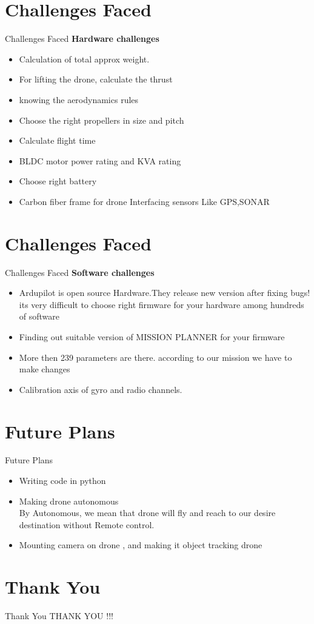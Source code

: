 \documentclass[10pt, a4paper]{beamer}
\begin{document}
\section{Challenges Faced}
\begin{frame}{Challenges Faced}
     \large\textbf{Hardware challenges}
	\begin{itemize}
	    \item Calculation of total approx weight.
	    \item For lifting the drone, calculate the thrust
	    \item knowing the aerodynamics rules
	    \item Choose the right propellers in size and pitch
	    \item Calculate flight time
	    \item BLDC motor power rating and KVA rating
	    \item Choose right battery 
	    \item Carbon fiber frame for drone
	    \inem Interfacing sensors Like GPS,SONAR
	    
	\end{itemize}
\end{frame}

\section{Challenges Faced}
\begin{frame}{Challenges Faced}
     \large\textbf{Software challenges}
	\begin{itemize}
	    \item Ardupilot is open source Hardware.They release new version after fixing bugs! its very difficult to choose right firmware  for your hardware among hundreds of software
	    \item Finding out suitable version of MISSION PLANNER for your firmware
	    \item More then 239 parameters are there. according to our mission we have to make changes
		\item Calibration axis of gyro and radio channels.
	\end{itemize}
\end{frame}


\section{Future Plans}
\begin{frame}{Future Plans}
	\begin{itemize}
	    
		\item Writing code in python 
		\item Making drone autonomous\\
		By Autonomous, we mean that drone will fly and reach to our desire destination without Remote control.
		\item Mounting camera on drone , and making it object tracking drone
	\end{itemize}
\end{frame}


\section{Thank You}
\begin{frame}{Thank You}
	\centering THANK YOU !!!
\end{frame}
\end{document}
